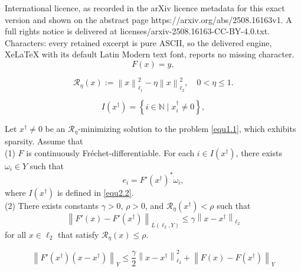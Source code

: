 \documentclass[10pt,a4paper]{amsart}
\begin{document}
International licence, as recorded in the arXiv licence metadata for this exact version and shown on the abstract page https://arxiv.org/abs/2508.16163v1. A full rights notice is delivered at licenses/arxiv-2508.16163-CC-BY-4.0.txt. Characters: every retained excerpt is pure ASCII, so the delivered engine, XeLaTeX with its default Latin Modern text font, reports no missing character.
\begin{equation}\label{equ1.1}
     F\left(x\right)=y,
\end{equation}

\begin{equation}\label{equ1.3}
    \mathcal{R}_{\eta}\left(x\right):=\left\|x\right\|_{\ell_{1}}^{2} -\eta\left\|x\right\|_{\ell_{2}}^{2},\quad 0<\eta\leq 1.
\end{equation}

\begin{equation}\label{equ2.2}
    I\left(x^{\dagger}\right)=\left\{i\in\mathbb{N}\mid x_{i}^{\dagger}\neq0\right\},
\end{equation}

\begin{assumption}\label{ass3.1}
    Let $x^{\dagger}\neq 0$ be an $\mathcal{R}_{\eta}$-minimizing solution to the problem \eqref{equ1.1}, which exhibits sparsity. Assume that \\
    (1) $F$ is continuously Fr\'{e}chet-differentiable. For each $i\in I\left(x^{\dagger}\right)$, there exists $\omega_{i}\in Y$ such that
    \begin{equation}\label{equ3.1}
        e_{i} = F'\left(x^{\dagger}\right)^{*}\omega_{i},
    \end{equation}
    where $I\left(x^{\dagger}\right)$ is defined in \eqref{equ2.2}. \\
    (2) There exists constants $\gamma>0$, $\rho>0$, and $\mathcal{R}_{\eta}\left(x^{\dagger}\right)<\rho$ such that
    \begin{equation}\label{equ3.2}
        \left\|F'\left(x\right)-F'\left(x^{\dagger}\right)\right\|_{L\left(\ell_{2}, Y\right)}\leq \gamma\left\|x-x^{\dagger}\right\|_{\ell_{2}}
    \end{equation}
    for all $x\in\ell_{2}$ that satisfy $\mathcal{R}_{\eta}\left(x\right)\leq \rho$.
\end{assumption}

    \begin{equation}\label{equ3.4}
        \left\|F'\left(x^{\dagger}\right)\left(x-x^{\dagger}\right)\right\|_{Y}\leq \frac{\gamma}{2}\left\|x-x^{\dagger}\right\|_{\ell_{2}}^{2}+ \left\|F\left(x\right)-F\left(x^{\dagger}\right)\right\|_{Y}
    \end{equation}
\end{document}
